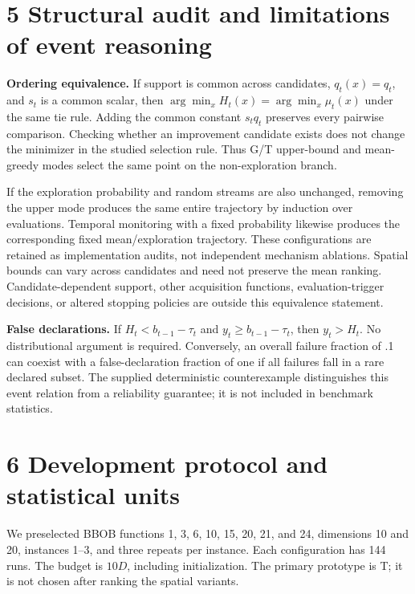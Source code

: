 \documentclass[11pt,a4paper]{article}
\begin{document}
\hypertarget{structural-audit-and-limitations-of-event-reasoning}{%
\section{5 Structural audit and limitations of event
reasoning}\label{structural-audit-and-limitations-of-event-reasoning}}

\textbf{Ordering equivalence.} If support is common across candidates,
\(q_t(x)=q_t\), and \(s_t\) is a common scalar, then
\(\arg\min_xH_t(x)=\arg\min_x\mu_t(x)\) under the same tie rule. Adding
the common constant \(s_tq_t\) preserves every pairwise comparison.
Checking whether an improvement candidate exists does not change the
minimizer in the studied selection rule. Thus G/T upper-bound and
mean-greedy modes select the same point on the non-exploration branch.

If the exploration probability and random streams are also unchanged,
removing the upper mode produces the same entire trajectory by induction
over evaluations. Temporal monitoring with a fixed probability likewise
produces the corresponding fixed mean/exploration trajectory. These
configurations are retained as implementation audits, not independent
mechanism ablations. Spatial bounds can vary across candidates and need
not preserve the mean ranking. Candidate-dependent support, other
acquisition functions, evaluation-trigger decisions, or altered stopping
policies are outside this equivalence statement.

\textbf{False declarations.} If \(H_t<b_{t-1}-\tau_t\) and
\(y_t\ge b_{t-1}-\tau_t\), then \(y_t>H_t\). No distributional argument
is required. Conversely, an overall failure fraction of .1 can coexist
with a false-declaration fraction of one if all failures fall in a rare
declared subset. The supplied deterministic counterexample distinguishes
this event relation from a reliability guarantee; it is not included in
benchmark statistics.

\hypertarget{development-protocol-and-statistical-units}{%
\section{6 Development protocol and statistical
units}\label{development-protocol-and-statistical-units}}

We preselected BBOB functions 1, 3, 6, 10, 15, 20, 21, and 24,
dimensions 10 and 20, instances 1--3, and three repeats per instance.
Each configuration has 144 runs. The budget is \(10D\), including
initialization. The primary prototype is T; it is not chosen after
ranking the spatial variants.
\end{document}
